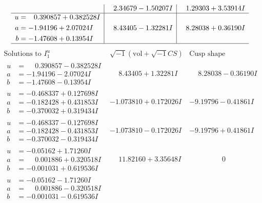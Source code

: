 \documentclass[1p]{elsarticle_modified}
\theoremstyle{definition}
\newcommand{\I}{\sqrt{-1}}
\begin{document}
$$\begin{array}{c|c|c}
 & \phantom{-}2.34679 - 1.50207 I & \phantom{-}1.29303 + 3.53914 I \\ \hline\begin{aligned}
u &= \phantom{-}0.390857 + 0.382528 I \\
a &= -1.94196 + 2.07024 I \\
b &= -1.47608 + 0.13954 I\end{aligned}
 & \phantom{-}8.43405 - 1.32281 I & \phantom{-}8.28038 + 0.36190 I\\
 \hline 
 \end{array}$$\newpage$$\begin{array}{c|c|c}  
\text{Solutions to }I^u_{1}& \I (\text{vol} + \sqrt{-1}CS) & \text{Cusp shape}\\
 \hline 
\begin{aligned}
u &= \phantom{-}0.390857 - 0.382528 I \\
a &= -1.94196 - 2.07024 I \\
b &= -1.47608 - 0.13954 I\end{aligned}
 & \phantom{-}8.43405 + 1.32281 I & \phantom{-}8.28038 - 0.36190 I \\ \hline\begin{aligned}
u &= -0.468337 + 0.127698 I \\
a &= -0.182428 + 0.431853 I \\
b &= -0.370032 + 0.319434 I\end{aligned}
 & -1.073810 + 0.172026 I & -9.19796 - 0.41861 I \\ \hline\begin{aligned}
u &= -0.468337 - 0.127698 I \\
a &= -0.182428 - 0.431853 I \\
b &= -0.370032 - 0.319434 I\end{aligned}
 & -1.073810 - 0.172026 I & -9.19796 + 0.41861 I \\ \hline\begin{aligned}
u &= -0.05162 + 1.71260 I \\
a &= \phantom{-}0.001886 + 0.320518 I \\
b &= -0.001031 + 0.619536 I\end{aligned}
 & \phantom{-}11.82160 + 3.35648 I & \phantom{-0.000000 } 0 \\ \hline\begin{aligned}
u &= -0.05162 - 1.71260 I \\
a &= \phantom{-}0.001886 - 0.320518 I \\
b &= -0.001031 - 0.619536 I\end{aligned}

\end{array}$$
\end{document}
